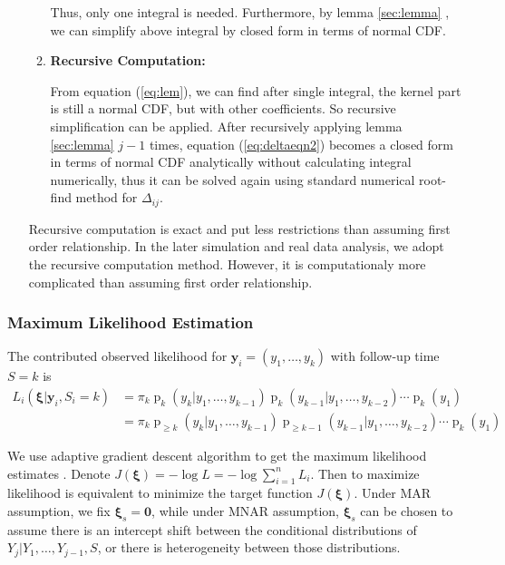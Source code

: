 \documentclass[12pt]{article}
\DeclareMathOperator{\pr}{p}
\begin{document}
\begin{itemize}
\begin{enumerate}
    Thus, only one integral is needed. Furthermore, by lemma \ref{sec:lemma}
    , we can simplify above integral by closed form in
    terms of normal CDF.

  \item \textbf{Recursive Computation: }

    From equation (\ref{eq:lem}), we can find after single integral,
    the kernel part is still a normal CDF, but with other
    coefficients. So recursive simplification can be applied. After
    recursively applying lemma \ref{sec:lemma} $j - 1$ times, equation
    (\ref{eq:deltaeqn2}) becomes a closed form in terms of normal CDF
    analytically without calculating integral numerically, thus it can
    be solved again using standard numerical root-find method for
    $\Delta_{ij}$.
  \end{enumerate}

  Recursive computation is exact and put less restrictions than
  assuming first order relationship. In the later simulation and real
  data analysis, we adopt the recursive computation method. However,
  it is computationaly more complicated than assuming first order
  relationship.

\end{itemize}

\subsubsection{Maximum Likelihood Estimation}
\label{sec:mle}

The contributed observed likelihood for $\bm y_i = (y_1, \ldots, y_k)$
with follow-up time $S = k$ is
\begin{align} \label{eq:ll}
  L_i(\bm \xi| \bm y_i, S_{i} = k) & = \pi_k\pr_k (y_k | y_1, \ldots, y_{k-1}) 
\pr_k (y_{k-1}|y_1, \ldots, y_{k-2}) \cdots \pr_{k} (y_1) \\
  & = \pi_k \pr_{\geq k} (y_k | y_1, \ldots, y_{k-1}) \pr_{\geq k-1}
  (y_{k-1}|y_1, \ldots, y_{k-2}) \cdots \pr_{k} (y_1) \nonumber
\end{align}

We use adaptive gradient descent algorithm to get the maximum
likelihood estimates \citet{ried1993}. Denote $J(\bm
\xi) = - \log L = - \log \sum_{i = 1}^n L_i$.  Then to maximize
likelihood is equivalent to minimize the target function $J(\bm
\xi)$. Under MAR assumption, we fix $\bm \xi_s = \bm 0$, while under
MNAR assumption, $\bm \xi_s $ can be chosen to assume there is an
intercept shift between the conditional distributions of $Y_{j}|
Y_{1}, \ldots, Y_{j-1}, S$, or there is heterogeneity between those
distributions.
\end{document}
